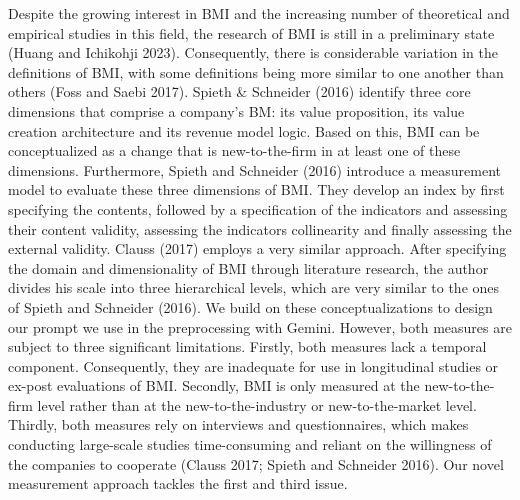 \documentclass[
]{article}
\begin{document}
Despite the growing interest in BMI and the increasing number of
theoretical and empirical studies in this field, the research of BMI is
still in a preliminary state (Huang and Ichikohji 2023). Consequently,
there is considerable variation in the definitions of BMI, with some
definitions being more similar to one another than others (Foss and
Saebi 2017). Spieth \& Schneider (2016) identify three core dimensions
that comprise a company's BM: its value proposition, its value creation
architecture and its revenue model logic. Based on this, BMI can be
conceptualized as a change that is new-to-the-firm in at least one of
these dimensions. Furthermore, Spieth and Schneider (2016) introduce a
measurement model to evaluate these three dimensions of BMI. They
develop an index by first specifying the contents, followed by a
specification of the indicators and assessing their content validity,
assessing the indicators collinearity and finally assessing the external
validity. Clauss (2017) employs a very similar approach. After
specifying the domain and dimensionality of BMI through literature
research, the author divides his scale into three hierarchical levels,
which are very similar to the ones of Spieth and Schneider (2016). We
build on these conceptualizations to design our prompt we use in the
preprocessing with Gemini. However, both measures are subject to three
significant limitations. Firstly, both measures lack a temporal
component. Consequently, they are inadequate for use in longitudinal
studies or ex-post evaluations of BMI. Secondly, BMI is only measured at
the new-to-the-firm level rather than at the new-to-the-industry or
new-to-the-market level. Thirdly, both measures rely on interviews and
questionnaires, which makes conducting large-scale studies
time-consuming and reliant on the willingness of the companies to
cooperate (Clauss 2017; Spieth and Schneider 2016). Our novel
measurement approach tackles the first and third issue.
\end{document}
